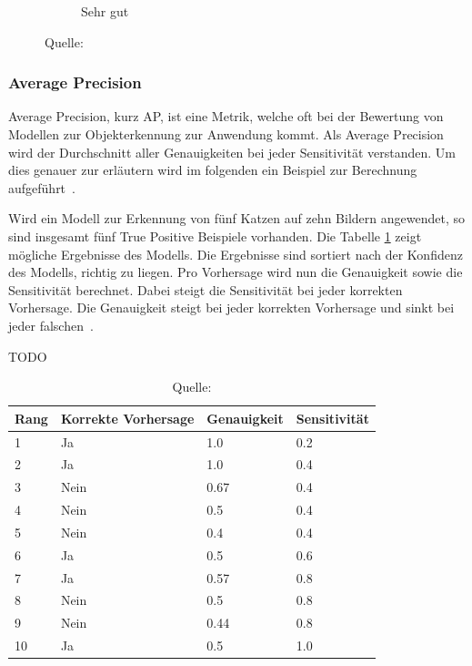 \begin{figure}[h]
\begin{subfigure}[b]{0.3\linewidth}
        \caption*{Sehr gut} 
        \vspace{2ex}
    \end{subfigure}
    
    \caption*{Quelle: \textcite{IoU}}
\end{figure}

\subsubsection{Average Precision}
\label{chap:ap}

Average Precision, kurz AP, ist eine Metrik, welche oft bei der Bewertung von Modellen zur Objekterkennung zur Anwendung kommt. Als Average Precision wird der Durchschnitt aller Genauigkeiten bei jeder Sensitivität verstanden. Um dies genauer zur erläutern wird im folgenden ein Beispiel zur Berechnung aufgeführt~\autocite{AP}.

Wird ein Modell zur Erkennung von fünf Katzen auf zehn Bildern angewendet, so sind insgesamt fünf True Positive Beispiele vorhanden. Die Tabelle \ref{tab:ap-example} zeigt mögliche Ergebnisse des Modells. Die Ergebnisse sind sortiert nach der Konfidenz des Modells, richtig zu liegen. Pro Vorhersage wird nun die Genauigkeit sowie die Sensitivität berechnet. Dabei steigt die Sensitivität bei jeder korrekten Vorhersage. Die Genauigkeit steigt bei jeder korrekten Vorhersage und sinkt bei jeder falschen~\autocite{AP}.

\begin{table}[h!]
    \captionsetup{width=.9\linewidth}
    \caption{TODO}
    \label{tab:ap-example}
    \centering
    \begin{tabular}{|l|l|l|l|} 
    \hline
    Rang & Korrekte Vorhersage & Genauigkeit & Sensitivität  \\ 
    \hline
    1    & Ja                  & 1.0         & 0.2           \\ 
    \hline
    2    & Ja                  & 1.0         & 0.4           \\ 
    \hline
    3    & Nein                & 0.67        & 0.4           \\ 
    \hline
    4    & Nein                & 0.5         & 0.4           \\ 
    \hline
    5    & Nein                & 0.4         & 0.4           \\ 
    \hline
    6    & Ja                  & 0.5         & 0.6           \\ 
    \hline
    7    & Ja                  & 0.57        & 0.8           \\ 
    \hline
    8    & Nein                & 0.5         & 0.8           \\ 
    \hline
    9    & Nein                & 0.44        & 0.8           \\ 
    \hline
    10   & Ja                  & 0.5         & 1.0           \\
    \hline
    \end{tabular}
    \caption*{Quelle: \textcite{AP}}
\end{table}

